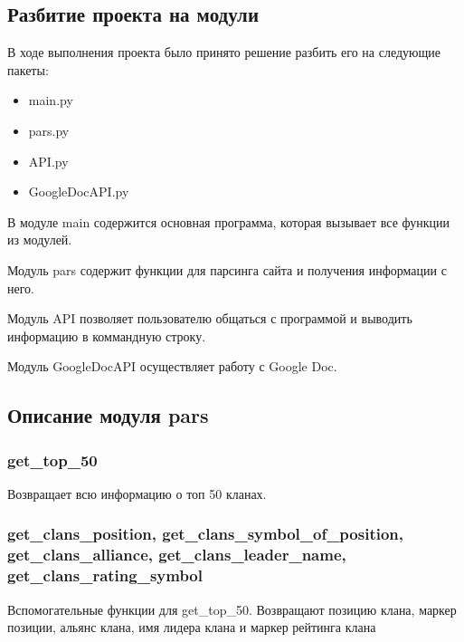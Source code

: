 \subsection{Разбитие проекта на модули}
В ходе выполнения проекта было принято решение разбить его на следующие пакеты:

\begin{itemize}

	\item main.py
	\item pars.py
	\item API.py
	\item GoogleDocAPI.py
	
\end{itemize}

В модуле main содержится основная программа, которая вызывает все функции из модулей.

Модуль pars содержит функции для парсинга сайта и получения информации с него.

Модуль API позволяет пользователю общаться с программой и выводить информацию в коммандную строку.

Модуль GoogleDocAPI осуществляет работу с Google Doc.

\subsection{Описание модуля pars}

\subsubsection{get\_top\_50}
Возвращает всю информацию о топ 50 кланах.

\parindent=1cm

\newpage

\subsubsection{get\_clans\_position,  get\_clans\_symbol\_of\_position,\\ get\_clans\_alliance,  get\_clans\_leader\_name,\\  get\_clans\_rating\_symbol}
Вспомогательные функции для get\_top\_50. Возвращают позицию клана, маркер позиции, альянс клана, имя лидера клана и маркер рейтинга клана

\parindent=1cm


